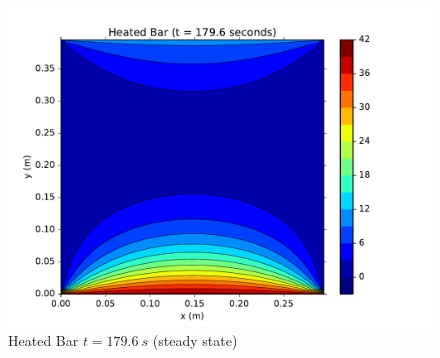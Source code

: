 \documentclass[addpoints]{exam}
\begin{document}
\begin{questions}
\begin{solution}
\begin{figure}[H]
\centering
\includegraphics[width=.8\linewidth]{figs/179-6_sec_heat-eq_colorplot.pdf}
\caption{Heated Bar $t=179.6\ s$ (steady state)}
\label{fig:steady_state}
\end{figure}


\end{solution}

\end{questions}

\end{document}

